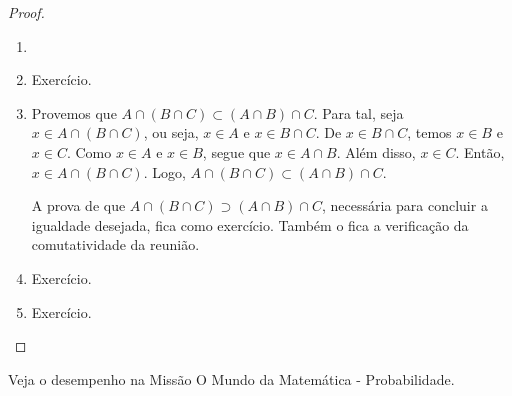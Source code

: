 \begin{proof}
\begin{enumerate}
	\item[]
	\item Exercício.
	\item Provemos que $A \cap (B \cap C) \subset (A \cap B) \cap C$. Para tal, seja $x \in A \cap (B \cap C)$, ou seja, $x \in A$ e $x \in B \cap C$. De $x \in B \cap C$, temos $x \in B$ e $x \in C$. Como $x \in A$ e $x \in B$, segue que $x \in A \cap B$. Além disso, $x \in C$. Então, $x \in A \cap (B \cap C)$. Logo, $A \cap (B \cap C) \subset (A \cap B) \cap C$. 

  A prova de que $A \cap (B \cap C) \supset (A \cap B) \cap C$, necessária para concluir a igualdade desejada, fica como exercício. Também o fica a verificação da comutatividade da reunião.
	\item Exercício.
	\item Exercício.
\end{enumerate}
\end{proof}

\begin{onlineact}
Veja o desempenho na Missão O Mundo da Matemática - Probabilidade.
\end{onlineact}
